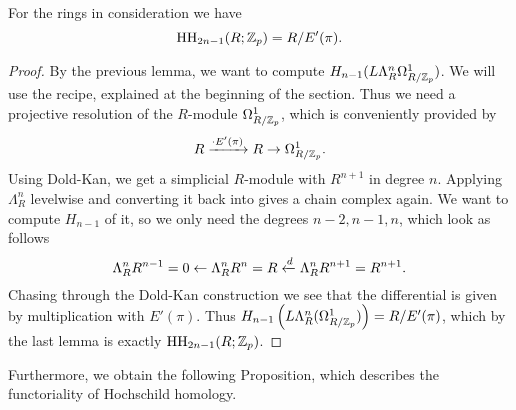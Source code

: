 \begin{lem}
    For the rings in consideration we have
    \begin{equation*}
        \operatorname{HH}_{2n-1}(R;\mathbb{Z}_p)=R/E'(\pi).
    \end{equation*}
\end{lem}
\begin{proof}
    By the previous lemma, we want to compute $H_{n-1}(L\Lambda^{n}_R \Omega^1_{R/\mathbb{Z}_p})$. We will use the recipe, explained at the beginning of the section. Thus we need a projective resolution of the $R$-module $\Omega^1_{R/\mathbb{Z}_p}$, which is conveniently provided by 
    \begin{equation*}
       R\xrightarrow{\cdot E'(\pi)} R\to \Omega^1_{R/\mathbb{Z}_p}. 
    \end{equation*}
    Using Dold-Kan, we get a simplicial $R$-module with $R^{n+1}$ in degree $n$. Applying $\Lambda_R^n$ levelwise and converting it back into gives a chain complex again. We want to compute $H_{n-1}$ of it, so we only need the degrees $n-2,n-1,n$, which look as follows 
    \begin{equation*}
        \Lambda_R^nR^{n-1}=0\leftarrow \Lambda_R^n R^n=R \xleftarrow{d} \Lambda_R^n R^{n+1}=R^{n+1}. 
    \end{equation*} 
    Chasing through the Dold-Kan construction we see that the differential is given by multiplication with $E'(\pi)$. Thus $H_{n-1}\left( L\Lambda_R^n(\Omega^1_{R/\mathbb{Z}_p}) \right)=R/E'(\pi)$, which by the last lemma is exactly $\operatorname{HH}_{2n-1}(R;\mathbb{Z}_p)$.
\end{proof}
Furthermore, we obtain the following Proposition, which describes the functoriality of Hochschild homology.
